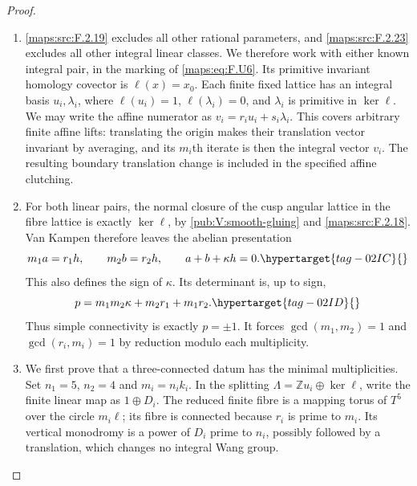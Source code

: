\documentclass[11pt,a4paper]{article}
\numberwithin{equation}{section}
\theoremstyle{definition}
\begin{document}
\begin{proof}
\begin{enumerate}[label=\arabic*.]
\item \ref{maps:src:F.2.19} excludes all other rational parameters, and \ref{maps:src:F.2.23}
excludes all other integral linear classes.
We therefore work with either known integral pair, in the
marking of \eqref{maps:eq:F.U6}.  Its primitive invariant homology
covector is $\ell(x)=x_0$.
Each finite fixed lattice has an integral basis
$u_i,\lambda_i$, where $\ell(u_i)=1$,
$\ell(\lambda_i)=0$, and $\lambda_i$ is primitive in
$\ker\ell$.
We may write the affine numerator as
$v_i=r_i u_i+s_i\lambda_i$.
This covers arbitrary finite affine lifts: translating the
origin makes their translation vector invariant by averaging,
and its $m_i$th iterate is then the integral vector $v_i$.
The resulting boundary translation change is included in the
specified affine clutching.

\item For both linear pairs, the normal closure of the cusp angular
lattice in the fibre lattice is exactly $\ker\ell$, by
\cref{pub:V:smooth-gluing} and \ref{maps:src:F.2.18}.  Van Kampen therefore leaves the abelian
presentation
\begin{equation}
 m_1a=r_1h,\qquad m_2b=r_2h,\qquad
 a+b+\kappa h=0.
 \hypertarget{tag-02IC}{}\label{maps:eq:F.T2}
\end{equation}
This also defines the sign of $\kappa$.
Its determinant is, up to sign,
\begin{equation}
 p=m_1m_2\kappa+m_2r_1+m_1r_2.
 \hypertarget{tag-02ID}{}\label{maps:eq:F.T3}
\end{equation}
Thus simple connectivity is exactly $p=\pm1$.
It forces $\gcd(m_1,m_2)=1$ and
$\gcd(r_i,m_i)=1$ by reduction modulo each multiplicity.

\item We first prove that a three-connected datum has the minimal
multiplicities.  Set $n_1=5$, $n_2=4$ and $m_i=n_i k_i$.
In the splitting $\Lambda=\mathbb Zu_i\oplus\ker\ell$,
write the finite linear map as $1\oplus D_i$.
The reduced finite fibre is a mapping torus of $T^5$ over
the circle $m_i\ell$; its fibre is connected because
$r_i$ is prime to $m_i$.
Its vertical monodromy is a power of $D_i$ prime to $n_i$,
possibly followed by a translation, which changes no
integral Wang group.


\end{enumerate}
\end{proof}
\end{document}
